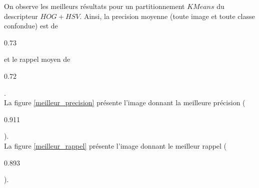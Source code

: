 \documentclass{book}
\begin{document}
\clearpage

On observe les meilleurs résultats pour un partitionnement $KMeans$ du descripteur $HOG+HSV$. Ainsi, la precision moyenne (toute image et toute classe confondue) est de 
\begin{bf}0.73\end{bf} et le rappel moyen de \begin{bf}0.72\end{bf}.\\
La figure \ref{meilleur_precision} présente l'image donnant la meilleure précision (\begin{bf}0.911\end{bf}).\\
La figure \ref{meilleur_rappel} présente l'image donnant le meilleur rappel (\begin{bf}0.893\end{bf}).\\
\end{document}
